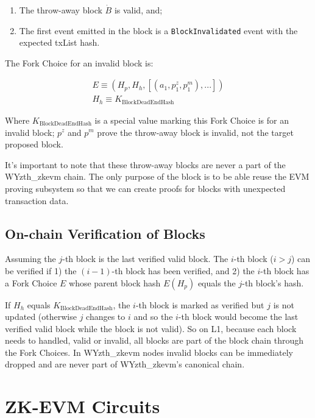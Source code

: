 \documentclass[9pt,oneside]{amsart}
\begin{document}
\begin{multicols}{2}
\begin{enumerate}
\item The throw-away block $\dot{B}$ is valid, and;
\item The first event emitted in the block is a \texttt{BlockInvalidated} event with the expected txList hash. 
\end{enumerate}

The Fork Choice for an invalid block is:

\begin{eqnarray}
E \equiv (H_p, H_h, [(a_1, p^{z}_1, p^{m}_1),...]) \\
H_h \equiv K_{\mathrm{BlockDeadEndHash}}
\end{eqnarray}

Where $K_{\mathrm{BlockDeadEndHash}}$ is a special value marking this Fork Choice is for an invalid block; $p^{z}$ and  $p^{m}$ prove the throw-away block is invalid, not the target proposed block.

It's important to note that these throw-away blocks are never a part of the WYzth_zkevm chain. The only purpose of the block is to be able reuse the EVM proving subsystem so that we can create proofs for blocks with unexpected transaction data.

\subsection{On-chain Verification of Blocks}\label{sec:verifying}

Assuming the $j$-th block is the last verified valid block. The $i$-th block ($i > j$) can be verified if 1) the $(i-1)$-th block has been verified, and 2) the $i$-th block has a Fork Choice $E$ whose parent block hash $E(H_p)$ equals the $j$-th block's hash.

If $H_h$ equals $K_{\mathrm{BlockDeadEndHash}}$, the $i$-th block is marked as verified but $j$ is not updated (otherwise $j$ changes to $i$ and so the $i$-th block would become the last verified valid block while the block is not valid). So on L1, because each block needs to handled, valid or invalid, all blocks are part of the block chain through the Fork Choices. In WYzth_zkevm nodes invalid blocks can be immediately dropped and are never part of WYzth_zkevm's canonical chain.

\section{ZK-EVM Circuits}


\end{multicols}
\end{document}
